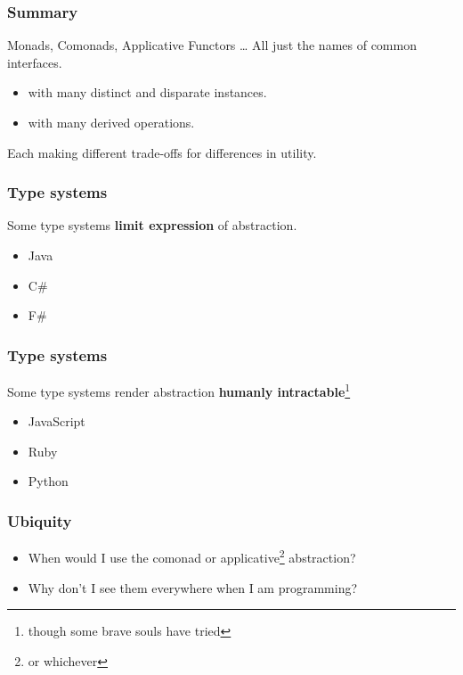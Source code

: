 \begin{frame}
\frametitle{Summary}
\begin{block}{Monads, Comonads, Applicative Functors \ldots}
All just the names of common interfaces.
\begin{itemize}
\item with many distinct and disparate instances.
\item with many derived operations.
\end{itemize}
Each making different trade-offs for differences in utility.
\end{block}
\end{frame}

\begin{frame}
\frametitle{Type systems}
\begin{block}{Some type systems \textbf{limit expression} of abstraction.}
\begin{itemize}
\item Java
\item C\#
\item F\#
\end{itemize}
\end{block}
\end{frame}

\begin{frame}
\frametitle{Type systems}
\begin{block}{Some type systems render abstraction \textbf{humanly intractable}}\footnote{though some brave souls have tried}
\begin{itemize}
\item JavaScript
\item Ruby
\item Python
\end{itemize}
\end{block}
\end{frame}

\begin{frame}
\frametitle{Ubiquity}
\begin{itemize}
\item When would I use the comonad or applicative\footnote{or whichever} abstraction?
\item Why don't I see them everywhere when I am programming?
\end{itemize}
\end{frame}
